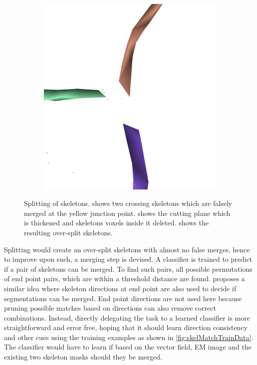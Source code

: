 \begin{figure}[htpb]
\begin{subfigure}[b]{\mywidth}
		\caption{\label{fig:skelSplitB}}
	\end{subfigure}
	\hspace{3mm}
	\begin{subfigure}[b]{\mywidth}
		\centering
		\includegraphics[width=\textwidth]{data/images/splitting/split.png}
		\caption{\label{fig:skelSplitC}}
	\end{subfigure}
	\caption{Splitting of skeletons.  shows two crossing skeletons which are falsely merged at the yellow junction point.  shows the cutting plane which is thickened and skeletons voxels inside it deleted.  shows the resulting over-split skeletons.}
	\label{fig:skelSplit}
\end{figure}

Splitting would create an over-split skeletons with almost no false merges, hence to improve upon such, a merging step is devised. A classifier is trained to predict if a pair of skeletons can be merged. To find such pairs, all possible permutations of end point pairs, which are within a threshold distance are found. \cite{Brain2019} proposes a similar idea where skeleton directions at end point are also used to decide if segmentations can be merged. End point directions are not used here because pruning possible matches based on directions can also remove correct combinations. Instead, directly delegating the task to a learned classifier is more straightforward and error free, hoping that it should learn direction consistency and other cues using the training examples as shown in \autoref{fig:skelMatchTrainData}. The classifier would have to learn if based on the vector field, EM image and the existing two skeleton masks should they be merged. 

